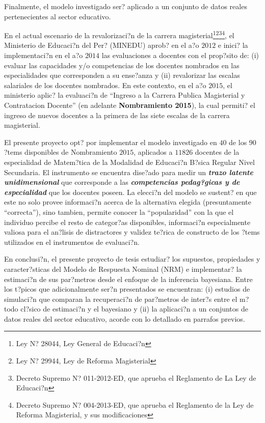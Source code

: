 Finalmente, el modelo investigado ser? aplicado a un conjunto de datos reales pertenecientes al sector educativo. 

En el actual escenario de la revalorizaci?n de la carrera magisterial\footnote{Ley N? 28044, Ley General de Educaci?n}\footnote{Ley N? 29944, Ley de Reforma Magisterial}\footnote{Decreto Supremo N? 011-2012-ED, que aprueba el Reglamento de La Ley de Educaci?n}\footnote{Decreto Supremo N? 004-2013-ED, que aprueba el Reglamento de la Ley de Reforma Magisterial, y sus modificaciones}, el Ministerio de Educaci?n del Per? (MINEDU) aprob? en el a?o $2012$ e inici? la implementaci?n en el a?o $2014$ las evaluaciones a docentes con el prop?sito de: (i) evaluar las capacidades y/o competencias de los docentes nombrados en las especialidades que corresponden a su ense?anza y (ii) revalorizar las escalas salariales de los docentes nombrados. En este contexto, en el a?o $2015$, el ministerio aplic? la evaluaci?n de ``Ingreso a la Carrera Publica Magisterial y Contratacion Docente'' (en adelante \textbf{Nombramiento 2015}), la cual permiti? el ingreso de nuevos docentes a la primera de las siete escalas de la carrera magisterial.

El presente proyecto opt? por implementar el modelo investigado en $40$ de los $90$ ?tems disponibles de Nombramiento $2015$, aplicados a $11826$ docentes de la especialidad de Matem?tica de la Modalidad de Educaci?n B?sica Regular Nivel Secundaria. El instrumento se encuentra dise?ado para medir un \textbf{\textit{trazo latente unidimensional}} que corresponde a las \textbf{\textit{competencias pedag?gicas y de especialidad}} que los docentes poseen. La elecci?n del modelo se sustent? en que este no solo provee informaci?n acerca de la alternativa elegida (presuntamente ``correcta''), sino tambien, permite conocer la ``popularidad'' con la que el individuo percibe el resto de categor?as disponibles, informaci?n especialmente valiosa para el an?lisis de distractores y validez te?rica de constructo de los ?tems utilizados en el instrumentos de evaluaci?n.

En conclusi?n, el presente proyecto de tesis estudiar? los supuestos, propiedades y caracter?sticas del Modelo de Respuesta Nominal (NRM) e implementar? la estimaci?n de sus par?metros desde el enfoque de la  inferencia bayesiana. Entre los t?picos que adicionalmente ser?n presentados se encuentran: (i) estudios de simulaci?n que comparan la recuperaci?n de par?metros de inter?s entre el m?todo cl?sico de estimaci?n y el bayesiano y (ii) la aplicaci?n a un conjuntos de datos reales del sector educativo, acorde con lo detallado en parrafos previos.



